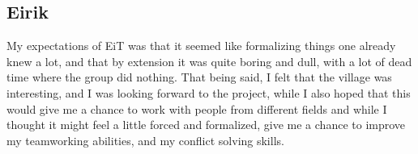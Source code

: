 \subsection{Eirik}
My expectations of EiT was that it seemed like formalizing things one already knew a lot, and that by extension it was quite boring and dull, with a lot of dead time where the group did nothing. That being said, I felt that the village was interesting, and I was looking forward to the project, while I also hoped that this would give me a chance to work with people from different fields and while I thought it might feel a little forced and formalized, give me a chance to improve my teamworking abilities, and my conflict solving skills.